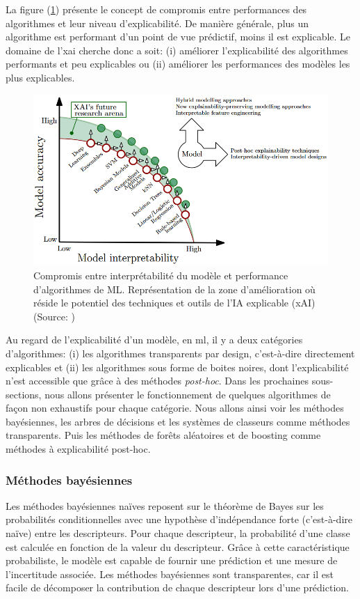 La figure (\ref{fig:xai-research}) présente le concept de compromis entre performances des algorithmes et leur niveau d'explicabilité. De manière générale, plus un algorithme est performant d'un point de vue prédictif, moins il est explicable. Le domaine de l'\gls{xai} cherche donc a soit: (i) améliorer l'explicabilité des algorithmes performants et peu explicables ou (ii) améliorer les performances des modèles les plus explicables.
\begin{figure}[!htbp]
 \centering
 \includegraphics[width=1\textwidth]{figures/xai-research.png}
 \caption[Compromis entre interprétabilité et performances des algo de ML]{Compromis entre interprétabilité du modèle et performance d'algorithmes de ML. Représentation de la zone d'amélioration où réside le potentiel des techniques et outils de l'IA explicable (xAI) (Source: \cite{arrieta_explainable_2019})}
 \label{fig:xai-research}
\end{figure}

Au regard de l'explicabilité d'un modèle, en \gls{ml}, il y a deux catégories d'algorithmes: (i) les algorithmes transparents par design, c'est-à-dire directement explicables et (ii) les algorithmes sous forme de boites noires, dont l'explicabilité n'est accessible que grâce à des méthodes \textit{post-hoc}. Dans les prochaines sous-sections, nous allons présenter le fonctionnement de quelques algorithmes de façon non exhaustifs pour chaque catégorie. Nous allons ainsi voir les méthodes bayésiennes, les arbres de décisions et les systèmes de classeurs comme méthodes transparents. Puis les méthodes de forêts aléatoires et de boosting comme méthodes à explicabilité post-hoc.

\subsubsection{Méthodes bayésiennes}
Les méthodes bayésiennes naïves reposent sur le théorème de Bayes sur les probabilités conditionnelles avec une hypothèse d'indépendance forte (c'est-à-dire naïve) entre les descripteurs. Pour chaque descripteur, la probabilité d'une classe est calculée en fonction de la valeur du descripteur. Grâce à cette caractéristique probabiliste, le modèle est capable de fournir une prédiction et une mesure de l'incertitude associée. Les méthodes bayésiennes sont transparentes, car il est facile de décomposer la contribution de chaque descripteur lors d'une prédiction.

